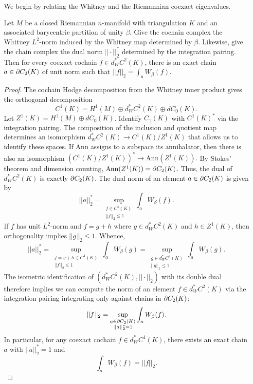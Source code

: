 We begin by relating the Whitney and the Riemannian coexact eigenvalues.
\begin{lem} \label{lem:4.1}
Let $M$ be a closed Riemannian $n$-manifold with triangulation $K$ and an associated barycentric partition of unity $\beta$. Give the cochain complex the Whitney $L^2$-norm induced by the Whitney map determined by $\beta.$ Likewise, give the chain complex the dual norm $||\cdot||_2^*$ determined by the integration pairing. Then for every coexact cochain $f\in d_W^*C^2(K)$, there is an exact chain $a\in \partial C_2(K)$ of unit norm such that $||f||_2 = \int_aW_{\beta}(f).$
\end{lem}
\begin{proof}

The cochain Hodge decomposition from the Whitney inner product gives the orthogonal decomposition $$C^1(K) = H^1(M) \oplus d_W^*C^2(K) \oplus dC_0(K).$$ Let $Z^1(K) = H^1(M)\oplus d C_0(K)$. Identify $C_1(K)$ with $C^1(K)^*$ via the integration pairing. The composition of the inclusion and quotient map determines an isomorphism $d_W^*C^2(K) \to C^1(K)/Z^1(K) $ that allows us to identify these spaces. If $\text{Ann}$ assigns to a subspace its annihalator, then there is also an isomorphism $(C^1(K)/Z^1(K))^*\to \text{Ann}(Z^1(K)).$ By Stokes’ theorem and dimension counting, $\text{Ann}(Z^1(K)) = \partial C_2(K)$.
Thus, the dual of $d_W^*C^2(K)$ is exactly $\partial C_2(K)$. The dual norm of an element $a \in \partial C_2(K)$ is given by $$||a||_2^* = \sup\limits_{\substack{f\in C^1(K)\\||f||_2\leq 1}}\int_a W_{\beta}(f).$$
If $f$ has unit $L^2$-norm and $f = g + h$ where $g\in d_W^*C^2(K)$ and $h\in Z^1(K)$, then orthogonality implies $||g||_2\leq 1.$ Whence,
$$||a||_2^* = \sup\limits_{\substack{f = g + h\in C^1(K)\\||f||_2\leq 1}}\int_a W_{\beta}(g) = \sup\limits_{\substack{g\in d^*_WC^2(K)\\||g||_2\leq 1}}\int_a W_{\beta}(g).$$ The isometric identification of $(d^*_WC^2(K),||\cdot||_2)$ with its double dual therefore implies we can compute the norm of an element $f\in d^*_WC^2(K)$ via the integration pairing integrating only against chains in $\partial C_2(K)$:
$$||f||_2= \sup\limits_{\substack{a \in \partial C_2(K)\\||a||_2^* = 1}}\int_aW_{\beta}(f).$$ In particular, for any coexact cochain $f\in d^*_WC^1(K)$, there exists an exact chain $a$ with $||a||^*_2=1$ and $$\int_aW_{\beta}(f) = ||f||_2.$$
\end{proof}



